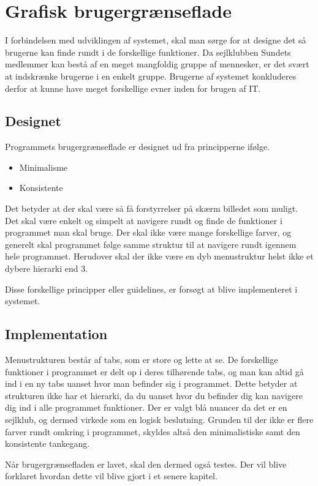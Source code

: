 \chapter{Grafisk brugergrænseflade} \label{chap:GUI}

I forbindelsen med udviklingen af systemet, skal man sørge for at designe det så brugerne kan finde rundt i de forskellige funktioner. Da sejlklubben Sundets medlemmer kan bestå af en meget mangfoldig gruppe af mennesker, er det svært at indskrænke brugerne i en enkelt gruppe. Brugerne af systemet konkluderes derfor at kunne have meget forskellige evner inden for brugen af IT.

\section{Designet} \label{sec:Designet}

Programmets brugergrænseflade er designet ud fra principperne ifølge. \citep{gui1} 

\begin{itemize}
	\item Minimalisme
	\item Konsistente
\end{itemize}

Det betyder at der skal være så få forstyrrelser på skærm billedet som muligt. Det skal være enkelt og simpelt at navigere rundt og finde de funktioner i programmet man skal bruge. Der skal ikke være mange forskellige farver, og generelt skal programmet følge samme struktur til at navigere rundt igennem hele programmet. Herudover skal der ikke være en dyb menustruktur helst ikke et dybere hierarki end 3.

Disse forskellige principper eller guidelines, er forsøgt at blive implementeret i systemet.

\section{Implementation}\label{sec:Implementation}

Menustrukturen består af tabs, som er store og lette at se. De forskellige funktioner i programmet er delt op i deres tilhørende tabs, og man kan altid gå ind i en ny tabs uanset hvor man befinder sig i programmet. Dette betyder at strukturen ikke har et hierarki, da du uanset hvor du befinder dig kan navigere dig ind i alle programmet funktioner. Der er valgt blå nuancer da det er en sejlklub, og dermed virkede som en logisk beslutning. Grunden til der ikke er flere farver rundt omkring i programmet, skyldes altså den minimalistiske samt den konsistente tankegang.


Når brugergrænsefladen er lavet, skal den dermed også testes. Der vil blive forklaret hvordan dette vil blive gjort i et senere kapitel. 